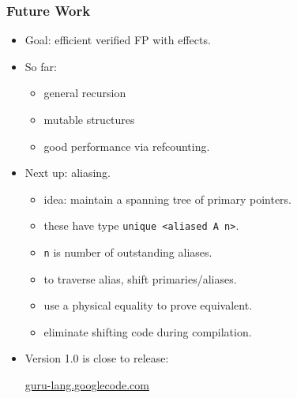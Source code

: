 \documentclass[11pt]{beamer}
\begin{document}
\begin{frame}
\frametitle{Future Work}

\begin{itemize}
\item Goal: efficient verified FP with effects.
\item So far: 
\begin{itemize}
\item general recursion
\item mutable structures
\item good performance via refcounting.
\end{itemize}
\item Next up: aliasing.
\begin{itemize}
\item idea: maintain a spanning tree of primary pointers.
\item these have type \texttt{unique <aliased A n>}.
\item \texttt{n} is number of outstanding aliases.
\item to traverse alias, shift primaries/aliases.
\item use a physical equality to prove equivalent.
\item eliminate shifting code during compilation.
\end{itemize}
\item Version 1.0 is close to release:

\begin{center}
\url{guru-lang.googlecode.com}
\end{center}

\end{itemize}

\end{frame}
\end{document}
